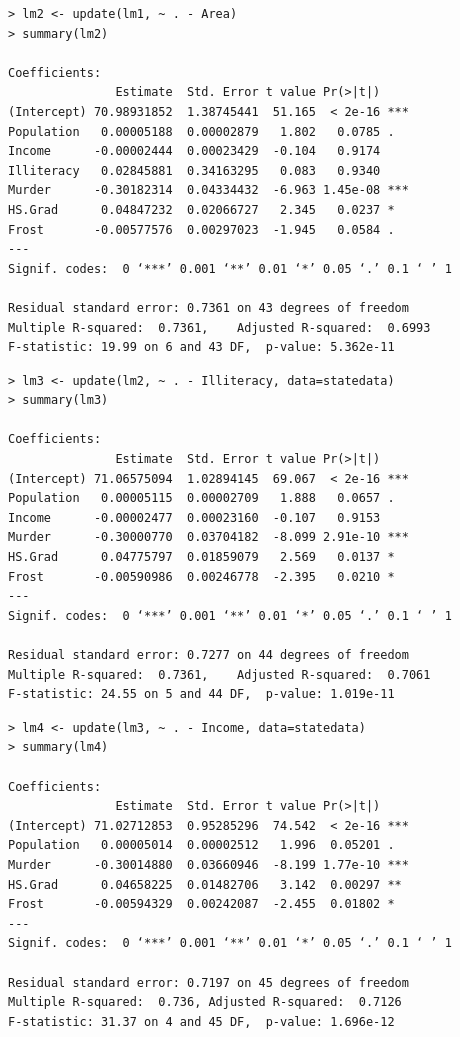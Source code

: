 \documentclass[10pt]{beamer}\usepackage[]{graphicx}\usepackage[]{color}
\begin{document}
\begin{frame}[fragile]
\scriptsize
\begin{verbatim}
> lm2 <- update(lm1, ~ . - Area)
> summary(lm2)

Coefficients:
               Estimate  Std. Error t value Pr(>|t|)    
(Intercept) 70.98931852  1.38745441  51.165  < 2e-16 ***
Population   0.00005188  0.00002879   1.802   0.0785 .  
Income      -0.00002444  0.00023429  -0.104   0.9174    
Illiteracy   0.02845881  0.34163295   0.083   0.9340    
Murder      -0.30182314  0.04334432  -6.963 1.45e-08 ***
HS.Grad      0.04847232  0.02066727   2.345   0.0237 *  
Frost       -0.00577576  0.00297023  -1.945   0.0584 .  
---
Signif. codes:  0 ‘***’ 0.001 ‘**’ 0.01 ‘*’ 0.05 ‘.’ 0.1 ‘ ’ 1

Residual standard error: 0.7361 on 43 degrees of freedom
Multiple R-squared:  0.7361,	Adjusted R-squared:  0.6993 
F-statistic: 19.99 on 6 and 43 DF,  p-value: 5.362e-11
\end{verbatim}
\end{frame}

\begin{frame}[fragile]
\scriptsize
\begin{verbatim}
> lm3 <- update(lm2, ~ . - Illiteracy, data=statedata)
> summary(lm3)

Coefficients:
               Estimate  Std. Error t value Pr(>|t|)    
(Intercept) 71.06575094  1.02894145  69.067  < 2e-16 ***
Population   0.00005115  0.00002709   1.888   0.0657 .  
Income      -0.00002477  0.00023160  -0.107   0.9153    
Murder      -0.30000770  0.03704182  -8.099 2.91e-10 ***
HS.Grad      0.04775797  0.01859079   2.569   0.0137 *  
Frost       -0.00590986  0.00246778  -2.395   0.0210 *  
---
Signif. codes:  0 ‘***’ 0.001 ‘**’ 0.01 ‘*’ 0.05 ‘.’ 0.1 ‘ ’ 1

Residual standard error: 0.7277 on 44 degrees of freedom
Multiple R-squared:  0.7361,	Adjusted R-squared:  0.7061 
F-statistic: 24.55 on 5 and 44 DF,  p-value: 1.019e-11
\end{verbatim}
\end{frame}

\begin{frame}[fragile]
\scriptsize
\begin{verbatim}
> lm4 <- update(lm3, ~ . - Income, data=statedata)
> summary(lm4)

Coefficients:
               Estimate  Std. Error t value Pr(>|t|)    
(Intercept) 71.02712853  0.95285296  74.542  < 2e-16 ***
Population   0.00005014  0.00002512   1.996  0.05201 .  
Murder      -0.30014880  0.03660946  -8.199 1.77e-10 ***
HS.Grad      0.04658225  0.01482706   3.142  0.00297 ** 
Frost       -0.00594329  0.00242087  -2.455  0.01802 *  
---
Signif. codes:  0 ‘***’ 0.001 ‘**’ 0.01 ‘*’ 0.05 ‘.’ 0.1 ‘ ’ 1

Residual standard error: 0.7197 on 45 degrees of freedom
Multiple R-squared:  0.736,	Adjusted R-squared:  0.7126 
F-statistic: 31.37 on 4 and 45 DF,  p-value: 1.696e-12
\end{verbatim}
\end{frame}
\end{document}
